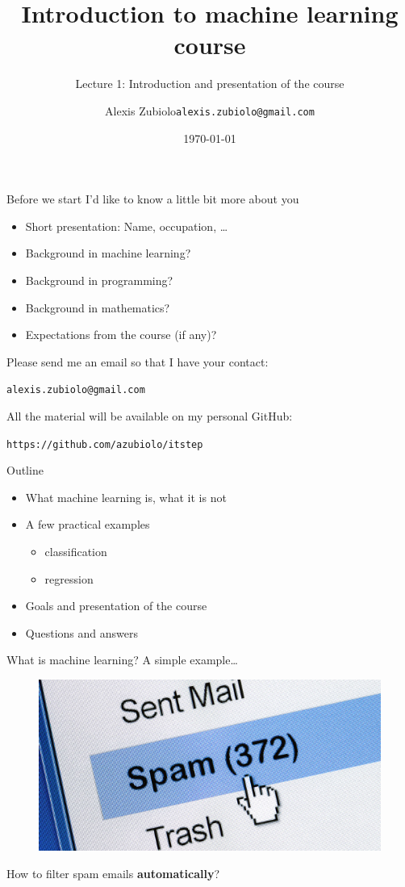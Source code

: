 \documentclass{beamer}
\title[Course presentation]{Introduction to machine learning course}
\subtitle{Lecture 1: Introduction and presentation of the course}
\author{Alexis Zubiolo\newline\texttt{alexis.zubiolo@gmail.com}}
\institute{Data Science Team Lead @ Adcash}
\date{\today}
\begin{document}
\begin{frame}
  \titlepage
\end{frame}

\begin{frame}{Before we start}
\vfill
I'd like to know a little bit more about you
\vfill
\begin{itemize}
	\item Short presentation: Name, occupation, \ldots
	\item Background in machine learning?
	\item Background in programming?
	\item Background in mathematics?
	\item Expectations from the course (if any)?
\end{itemize}
\vfill
Please send me an email so that I have your contact:
\vfill
\begin{center}
\texttt{alexis.zubiolo@gmail.com}
\end{center}
\vfill
All the material will be available on my personal GitHub:
\vfill
\begin{center}
\texttt{https://github.com/azubiolo/itstep}
\end{center}
\vfill
\end{frame}

\begin{frame}{Outline}
\vfill
\begin{itemize}
  \item What machine learning is, what it is not
\vfill
  \item A few practical examples
  \begin{itemize}
  	\item classification
  	\item regression
  \end{itemize}
\vfill
  \item Goals and presentation of the course 
\vfill
  \item Questions and answers
\end{itemize}
\vfill

\end{frame}

\begin{frame}{What is machine learning?}
\vfill
A simple example\ldots
\vfill
\begin{figure}
\centering
\includegraphics[width=\textwidth]{images/spam.jpg}
\end{figure}
\vfill
How to filter spam emails \textbf{automatically}?
\vfill
\end{frame}
\end{document}
